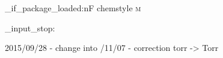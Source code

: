 %
%
%
%
%

\RequirePackage{siunitx}

\DeclareSIUnit {}
\DeclareSIUnit {}
\DeclareSIUnit {}
\DeclareSIUnit {}
\DeclareSIUnit \moLar      {\mole\per\liter}
\DeclareSIUnit \MolMass    {\gram\per\mole}
\DeclareSIUnit {}

  \DeclareSIUnit {}
\EndChemcompatibility

  \DeclareSIUnit {}
\EndChemcompatibility

  \DeclareSIUnit {}
\EndChemcompatibility

\AtEndPreamble
  {
    \chemmacros_if_package_loaded:nF {chemstyle}
      {
        \DeclareSIUnit {\cmc  } {\cubic\centi\metre}
        \DeclareSIUnit {\molar} {\mole\per\cubic\deci\metre}
        \DeclareSIUnit {\Molar} {\textsc{m}}
      }
  }

\file_input_stop:

2015/09/28 - change \AtBeginDocument into /11/07 - correction torr -> Torr

